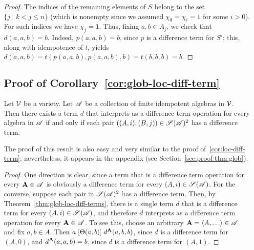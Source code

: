 \begin{proof}
The indices of the remaining elements of $S$
belong to the set $\{j \mid k<j\leq n\}$ (which is nonempty since we
assumed $\chi_0 = \chi_i = 1$ for some $i>0$).
For such indices we have $\chi_j = 1$.
Thus, fixing $a, b \in A_j$, we check that $d(a,a,b) = b$.
Indeed, $p(a,a,b) = b$, since $p$ is a \glocal difference term for $S'$; 
this, along with idempotence of $t$, yields
$d(a,a,b) =t(p(a,a,b), p(a,a,b), b)=t(b, b, b) =b$.
\end{proof}

\subsection{Proof of Corollary~\ref{cor:glob-loc-diff-term}}
\label{sec:proof-cor:glob}
\begin{corollary}[\ref{cor:glob-loc-diff-term}]
  Let $\mathcal{V}$ be a variety.  Let $\mathscr{A}$ be a collection of finite idempotent
  algebras in $\mathcal{V}$. %
  Then there exists a term $d$ that interprets as a difference term operation
  for every algebra in $\mathscr{A}$
  if and only if each pair $((A,i), (B,j)) \in \mathscr{S}(\mathscr{A})^2$ has a \glocal
  difference term.
\end{corollary}
The proof of this result is also easy and very similar to the proof
of~\ref{cor:loc-diff-term}; nevertheless, it appears in the appendix
(see Section~\ref{sec:proof-thm:glob}).
\begin{proof}
  One direction is clear, since a term that is a difference term operation for
  every $\mathbf{A} \in \mathscr{A}$ is obviously a \glocal difference term for
  every $(A, i) \in \mathscr{S}(\mathscr{A})$.
  For the converse, suppose
  each pair in $\mathscr{S}(\mathscr{A})^2$ has a \glocal
  difference term. Then, by Theorem~\ref{thm:glob-loc-diff-terms},
  there is a single term $d$ that is a \glocal difference term for every 
  $(A, i) \in \mathscr{S}(\mathscr{A})$, 
  and therefore $d$ interprets as a difference term operation for every $\mathbf{A} \in \mathscr{A}$.
  To see this, choose an arbitrary $\bA = \<A, \dots\> \in \scA$ and fix $a, b \in A$. 
  Then $a \mathrel{[\Theta(a,b)]} d^{\mathbf{A}}(a,b,b)$,
  since $d$ is a \glocal difference term for $(A,0)$,
  and $d^{\mathbf{A}}(a,a,b) = b$, since $d$ is a \glocal
  difference term for $(A,1)$. 
\end{proof}





